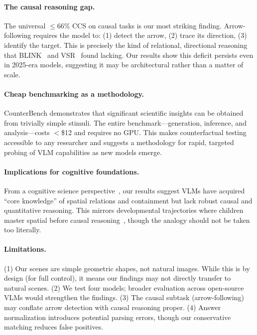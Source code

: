 \documentclass[10pt,twocolumn,letterpaper]{article}
\newcommand{\method}{CounterBench\xspace}
\newcommand{\ccs}{CCS\xspace}
\begin{document}
\paragraph{The causal reasoning gap.}
The universal $\leq$66\% \ccs on causal tasks is our most striking finding. Arrow-following requires the model to: (1) detect the arrow, (2) trace its direction, (3) identify the target. This is precisely the kind of relational, directional reasoning that BLINK~\cite{fu2024blink} and VSR~\cite{liu2023vsr} found lacking. Our results show this deficit persists even in 2025-era models, suggesting it may be architectural rather than a matter of scale.

\paragraph{Cheap benchmarking as a methodology.}
\method demonstrates that significant scientific insights can be obtained from trivially simple stimuli. The entire benchmark---generation, inference, and analysis---costs $<$\$12 and requires no GPU. This makes counterfactual testing accessible to any researcher and suggests a methodology for rapid, targeted probing of VLM capabilities as new models emerge.

\paragraph{Implications for cognitive foundations.}
From a cognitive science perspective~\cite{spelke2007core}, our results suggest VLMs have acquired ``core knowledge'' of spatial relations and containment but lack robust causal and quantitative reasoning. This mirrors developmental trajectories where children master spatial before causal reasoning~\cite{gopnik2004causal}, though the analogy should not be taken too literally.

\paragraph{Limitations.}
(1) Our scenes are simple geometric shapes, not natural images. While this is by design (for full control), it means our findings may not directly transfer to natural scenes. (2) We test four models; broader evaluation across open-source VLMs would strengthen the findings. (3) The causal subtask (arrow-following) may conflate arrow detection with causal reasoning proper. (4) Answer normalization introduces potential parsing errors, though our conservative matching reduces false positives.
\end{document}

